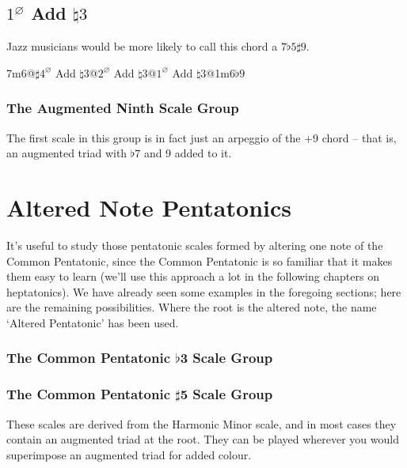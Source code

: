\documentclass[english]{./gbook}
\begin{document}
\begin{large}
\subsection{$1^{\varnothing}$ Add $\natural3$}
Jazz musicians would be more likely to call this chord a $7\flat5\sharp9$.

7m6@$\sharp4^{\varnothing}$ Add $\natural3$@$2^{\varnothing}$ Add $\natural3$@$1^{\varnothing}$ Add $\natural3$@1m6$\flat9$%

\subsubsection{The Augmented Ninth Scale Group}
The first scale in this group is in fact just an arpeggio of the +9 chord -- that is, an augmented triad with $\flat7$ and 9 added to it.

\section{Altered Note Pentatonics}

It's useful to study those pentatonic scales formed by altering one note of the Common Pentatonic, since the Common Pentatonic is so familiar that it makes them easy to learn (we'll use this approach a lot in the following chapters on heptatonics). We have already seen some examples in the foregoing sections; here are the remaining possibilities. Where the root is the altered note, the name `Altered Pentatonic' has been used.


\subsubsection{The Common Pentatonic $\flat$3 Scale Group}

 \subsubsection{The Common Pentatonic $\sharp$5 Scale Group}
 These scales are derived from the Harmonic Minor scale, and in most cases they contain an augmented triad at the root. They can be played wherever you would superimpose an augmented triad for added colour.


\end{large}
\end{document}
